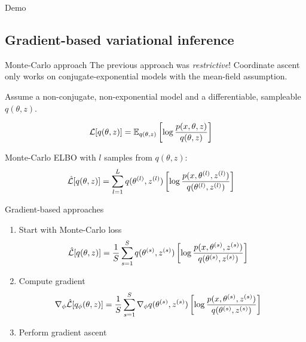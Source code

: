 \documentclass[10pt, compress]{beamer}
\begin{document}
\begin{frame}[standout]
Demo
\end{frame}

\subsection{Gradient-based variational inference}

\begin{frame}{Monte-Carlo approach}
  The previous approach was \emph{restrictive}! Coordinate ascent only
  works on conjugate-exponential models with the mean-field
  assumption.

  \pause

  Assume a non-conjugate, non-exponential model and a differentiable, sampleable
  $q(\theta, z)$.

  \pause

  \begin{align*}
    \mathcal{L}[q(\theta, z)] &= \mathbb{E}_{q(\theta, z)}\left[\log\frac{p(x, \theta, z)}{q(\theta, z)}\right]
  \end{align*}

  \pause

  Monte-Carlo ELBO with $l$ samples from $q(\theta, z)$:
  \begin{align*}
    \hat{\mathcal{L}}[q(\theta, z)] &= \sum_{l = 1}^L {q(\theta^{(l)}, z^{(l)})}\left[\log\frac{p(x, \theta^{(l)}, z^{(l)})}{q(\theta^{(l)}, z^{(l)})}\right]
  \end{align*}
\end{frame}

\begin{frame}{Gradient-based approaches}
  \begin{enumerate}
    \item Start with Monte-Carlo loss
    \begin{align*}
      \hat{\mathcal{L}}[q(\theta, z)] &= \frac{1}{S}\sum_{s = 1}^S {q(\theta^{(s)}, z^{(s)})}\left[\log\frac{p(x, \theta^{(s)}, z^{(s)})}{q(\theta^{(s)}, z^{(s)})}\right]
    \end{align*}
    \item Compute gradient
    \begin{align*}
      \nabla_{\phi}\hat{\mathcal{L}}[q_\phi(\theta, z)] &= \frac{1}{S}\sum_{s = 1}^S \nabla_\phi{q(\theta^{(s)}, z^{(s)})}\left[\log\frac{p(x, \theta^{(s)}, z^{(s)})}{q(\theta^{(s)}, z^{(s)})}\right]
    \end{align*}
    \item Perform gradient ascent
  \end{enumerate}
\end{frame}
\end{document}
